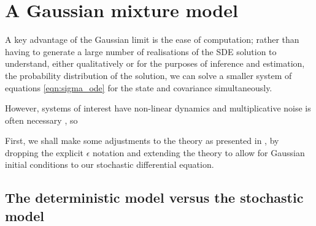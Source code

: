 \chapter{A Gaussian mixture model}\label{ch:gmm}

A key advantage of the Gaussian limit is the ease of computation; rather than having to generate a large number of realisations of the SDE solution to understand, either qualitatively or for the purposes of inference and estimation, the probability distribution of the solution, we can solve a smaller system of equations \eqref{eqn:sigma_ode} for the state and covariance simultaneously.

However, systems of interest have non-linear dynamics and multiplicative noise is often necessary \citep[e.g.]{SuraEtAl_2005_MultiplicativeNoiseNonGaussianity, etc.}, so


First, we shall make some adjustments to the theory as presented in , by dropping the explicit \(\epsilon\) notation and extending the theory to allow for Gaussian initial conditions to our stochastic differential equation.


\section{The deterministic model versus the stochastic model}

